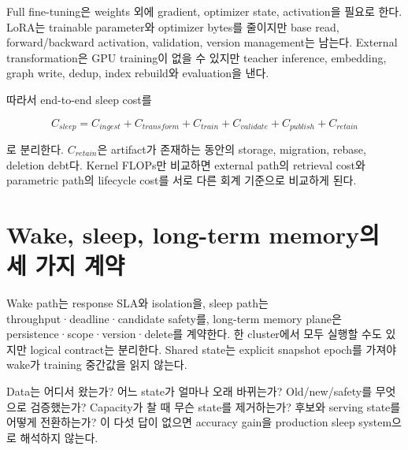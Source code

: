 Full fine-tuning은 weights 외에 gradient, optimizer state, activation을 필요로 한다. LoRA는 trainable
parameter와 optimizer bytes를 줄이지만 base read, forward/backward activation, validation, version
management는 남는다. External transformation은 GPU training이 없을 수 있지만 teacher inference,
embedding, graph write, dedup, index rebuild와 evaluation을 낸다.

따라서 end-to-end sleep cost를

\begin{equation}
C_{sleep}=C_{ingest}+C_{transform}+C_{train}+C_{validate}+C_{publish}+C_{retain}
\end{equation}

로 분리한다. $C_{retain}$은 artifact가 존재하는 동안의 storage, migration, rebase, deletion debt다.
Kernel FLOPs만 비교하면 external path의 retrieval cost와 parametric path의 lifecycle cost를 서로 다른
회계 기준으로 비교하게 된다.

\section{Wake, sleep, long-term memory의 세 가지 계약}

Wake path는 response SLA와 isolation을, sleep path는 throughput·deadline·candidate safety를, long-term
memory plane은 persistence·scope·version·delete를 계약한다. 한 cluster에서 모두 실행할 수도 있지만
logical contract는 분리한다. Shared state는 explicit snapshot epoch를 가져야 wake가 training 중간값을
읽지 않는다.

\begin{keypoint}
Data는 어디서 왔는가? 어느 state가 얼마나 오래 바뀌는가? Old/new/safety를 무엇으로 검증했는가?
Capacity가 찰 때 무슨 state를 제거하는가? 후보와 serving state를 어떻게 전환하는가? 이 다섯 답이
없으면 accuracy gain을 production sleep system으로 해석하지 않는다.
\end{keypoint}

